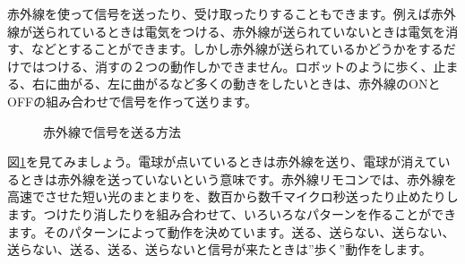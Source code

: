 \documentclass[text05.tex]{subfiles}
\begin{document}
赤外線を使って信号を送ったり、受け取ったりすることもできます。例えば赤外線が送られているときは電気をつける、赤外線が送られていないときは電気を消す、などとすることができます。しかし赤外線が送られているかどうかをするだけではつける、消すの２つの動作しかできません。ロボットのように歩く、止まる、右に曲がる、左に曲がるなど多くの動きをしたいときは、赤外線のONとOFFの組み合わせで信号を作って送ります。

\begin{figure}[H]
\centering

\caption{赤外線で信号を送る方法}
\label{ir}
\end{figure}

図\ref{ir}を見てみましょう。電球が点いているときは赤外線を送り、電球が消えているときは赤外線を送っていないという意味です。赤外線リモコンでは、赤外線を高速でさせた短い光のまとまりを、数百から数千マイクロ秒送ったり止めたりします。つけたり消したりを組み合わせて、いろいろなパターンを作ることができます。そのパターンによって動作を決めています。送る、送らない、送らない、送らない、送る、送る、送らないと信号が来たときは”歩く”動作をします。
\end{document}
